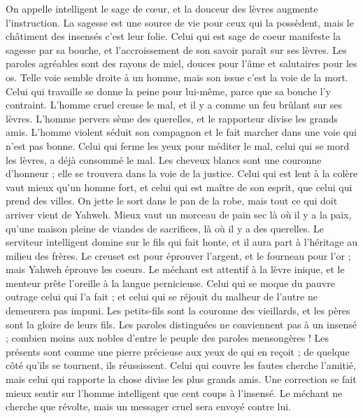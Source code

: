 \begin{multicols}{2}
On appelle intelligent le sage de cœur, et la douceur des lèvres augmente l'instruction.
La sagesse est une source de vie pour ceux qui la possèdent, mais le châtiment des insensés c’est leur folie.
Celui qui est sage de coeur manifeste la sagesse par sa bouche, et l’accroissement de son savoir paraît sur ses lèvres.
Les paroles agréables sont des rayons de miel, douces pour l'âme et salutaires pour les os.
Telle voie semble droite à un homme, mais son issue c’est la voie de la mort.
Celui qui travaille se donne la peine pour lui-même, parce que sa bouche l’y contraint.
L’homme cruel creuse le mal, et il y a comme un feu brûlant sur ses lèvres.
L'homme pervers sème des querelles, et le rapporteur divise les grands amis.
L'homme violent séduit son compagnon et le fait marcher dans une voie qui n'est pas bonne.
Celui qui ferme les yeux pour méditer le mal, celui qui se mord les lèvres, a déjà consommé le mal.
Les cheveux blancs sont une couronne d'honneur ; elle se trouvera dans la voie de la justice.
Celui qui est lent à la colère vaut mieux qu’un homme fort, et celui qui est maître de son esprit, que celui qui prend des villes.
On jette le sort dans le pan de la robe, mais tout ce qui doit arriver vient de Yahweh.
\VerseOne{}Mieux vaut un morceau de pain sec là où il y a la paix, qu'une maison pleine de viandes de sacrifices, là où il y a des querelles.
Le serviteur intelligent domine sur le fils qui fait honte, et il aura part à l'héritage au milieu des frères.
Le creuset est pour éprouver l'argent, et le fourneau pour l'or ; mais Yahweh éprouve les coeurs.
Le méchant est attentif à la lèvre inique, et le menteur prête l’oreille à la langue pernicieuse.
Celui qui se moque du pauvre outrage celui qui l’a fait ; et celui qui se réjouit du malheur de l’autre ne demeurera pas impuni.
Les petits-fils sont la couronne des vieillards, et les pères sont la gloire de leurs fils.
Les paroles distinguées ne conviennent pas à un insensé ; combien moins aux nobles d'entre le peuple des paroles mensongères !
Les présents sont comme une pierre précieuse aux yeux de qui en reçoit ; de quelque côté qu'ils se tournent, ils réussissent.
Celui qui couvre les fautes cherche l'amitié, mais celui qui rapporte la chose divise les plus grands amis.
Une correction se fait mieux sentir sur l'homme intelligent que cent coups à l’insensé.
Le méchant ne cherche que révolte, mais un messager cruel sera envoyé contre lui.

\end{multicols}
